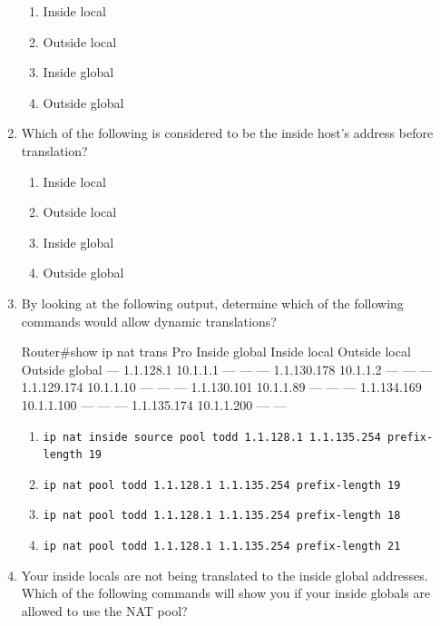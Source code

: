 \begin{enumerate}
  \begin{enumerate}
    \item
    Inside local
  \item
    Outside local
  \item
    Inside global
  \item
    Outside global
  \end{enumerate}
\item
  Which of the following is considered to be the inside host's address
  before translation?

  \begin{enumerate}
    \item
    Inside local
  \item
    Outside local
  \item
    Inside global
  \item
    Outside global
  \end{enumerate}
\item
  By looking at the following output, determine which of the following
  commands would allow dynamic translations?

\begin{cli}
Router#show ip nat trans
Pro   Inside global   Inside local   Outside local Outside global
---   1.1.128.1       10.1.1.1       ---           ---
---   1.1.130.178     10.1.1.2       ---           ---
---   1.1.129.174     10.1.1.10      ---           ---
---   1.1.130.101     10.1.1.89      ---           ---
---   1.1.134.169     10.1.1.100     ---           ---
---   1.1.135.174     10.1.1.200      ---           ---
\end{cli}

  \begin{enumerate}
    \item
    \texttt{ip\ nat\ inside\ source\ pool\ todd\ 1.1.128.1\ 1.1.135.254\ prefix-length\ 19}
  \item
    \texttt{ip\ nat\ pool\ todd\ 1.1.128.1\ 1.1.135.254\ prefix-length\ 19}
  \item
    \texttt{ip\ nat\ pool\ todd\ 1.1.128.1\ 1.1.135.254\ prefix-length\ 18}
  \item
    \texttt{ip\ nat\ pool\ todd\ 1.1.128.1\ 1.1.135.254\ prefix-length\ 21}
  \end{enumerate}
\item
  Your inside locals are not being translated to the inside global
  addresses. Which of the following commands will show you if your
  inside globals are allowed to use the NAT pool?


\end{enumerate}
